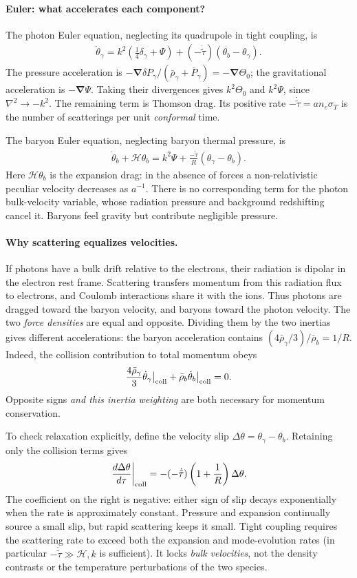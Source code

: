 \documentclass[12pt]{article}
\newcommand{\be}{\begin{eqnarray}}
\newcommand{\ee}{\end{eqnarray}}
\newcommand{\Hs}{\mathcal H}
\begin{document}
\paragraph{Euler: what accelerates each component?}
The photon Euler equation, neglecting its quadrupole in tight coupling, is
\be
\dot\theta_\gamma=k^2\left(\frac14\delta_\gamma+\Psi\right)
+(-\dot{\tilde\tau})(\theta_b-\theta_\gamma).
\label{eq:photoneuler}
\ee
The pressure acceleration is $-\boldsymbol\nabla\delta P_\gamma/
(\bar\rho_\gamma+\bar P_\gamma)=-\boldsymbol\nabla\Theta_0$; the gravitational
acceleration is $-\boldsymbol\nabla\Psi$. Taking their divergences gives
$k^2\Theta_0$ and $k^2\Psi$, since $\nabla^2\to-k^2$. The remaining term is
Thomson drag. Its positive rate $-\dot{\tilde\tau}=a n_e\sigma_T$ is the number of
scatterings per unit \emph{conformal} time.

The baryon Euler equation, neglecting baryon thermal pressure, is
\be
\dot\theta_b+\Hs\theta_b=k^2\Psi
+\frac{-\dot{\tilde\tau}}{R}(\theta_\gamma-\theta_b).
\label{eq:baryoneuler}
\ee
Here $\Hs\theta_b$ is the expansion drag: in the absence of forces a
non-relativistic peculiar velocity decreases as $a^{-1}$. There is no corresponding
term for the photon bulk-velocity variable, whose radiation pressure and background
redshifting cancel it. Baryons feel gravity but contribute negligible pressure.

\paragraph{Why scattering equalizes velocities.}
If photons have a bulk drift relative to the electrons, their radiation is dipolar
in the electron rest frame. Scattering transfers momentum from this radiation flux
to electrons, and Coulomb interactions share it with the ions. Thus photons are
dragged toward the baryon velocity, and baryons toward the photon velocity.
The two \emph{force densities} are equal and opposite. Dividing them by the two
inertias gives different accelerations: the baryon acceleration contains
$(4\bar\rho_\gamma/3)/\bar\rho_b=1/R$. Indeed, the collision contribution to total
momentum obeys
\[
\frac{4\bar\rho_\gamma}{3}\dot\theta_\gamma\big|_{\rm coll}
+\bar\rho_b\dot\theta_b\big|_{\rm coll}=0.
\]
Opposite signs \emph{and this inertia weighting} are both necessary for momentum
conservation.

To check relaxation explicitly, define the velocity slip
$\Delta\theta=\theta_\gamma-\theta_b$. Retaining only the collision terms gives
\[
\left.\frac{d\Delta\theta}{d\tau}\right|_{\rm coll}
=-(-\dot{\tilde\tau})\left(1+\frac1R\right)\Delta\theta.
\]
The coefficient on the right is negative: either sign of slip decays exponentially
when the rate is approximately constant. Pressure and expansion continually source
a small slip, but rapid scattering keeps it small. Tight coupling requires the
scattering rate to exceed both the expansion and mode-evolution rates (in
particular $-\dot{\tilde\tau}\gg\Hs,k$ is sufficient).
It locks \emph{bulk velocities}, not the density contrasts or the temperature
perturbations of the two species.
\end{document}

